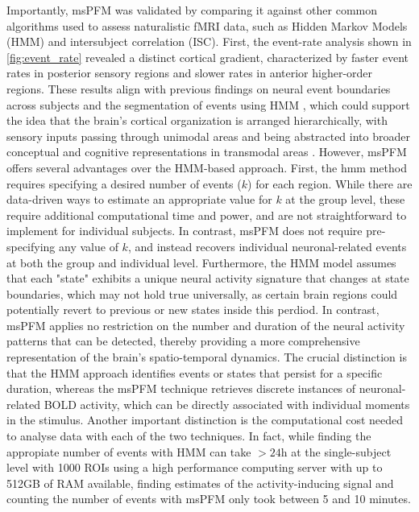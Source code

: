 Importantly, msPFM was validated by comparing it against other common algorithms
used to assess naturalistic fMRI data, such as Hidden Markov Models (HMM) and
intersubject correlation (ISC). First, the event-rate analysis shown in
\cref{fig:event_rate} revealed a distinct cortical gradient, characterized by
faster event rates in posterior sensory regions and slower rates in anterior
higher-order regions. These results align with previous findings on neural event
boundaries across subjects and the segmentation of events using HMM
\citep{Baldassano2017DiscoveringEventStructure,SavaSegal2022Individualvariabilityneural},
which could support the idea that the brain's cortical organization is arranged
hierarchically, with sensory inputs passing through unimodal areas and being
abstracted into broader conceptual and cognitive representations in transmodal
areas
\citep{Bernhardt2022Gradientsbrainorganization,Margulies2016Situatingdefaultmode,Samara2023Corticalgradientsnaturalistic}.
However, msPFM offers several advantages over the HMM-based approach. First, the
\acrshort*{hmm} method requires specifying a desired number of events ($k$) for
each region. While there are data-driven ways to estimate an appropriate value
for $k$ at the group level, these require additional computational time and
power, and are not straightforward to implement for individual subjects. In
contrast, msPFM does not require pre-specifying any value of $k$, and instead
recovers individual neuronal-related events at both the group and individual
level. Furthermore, the HMM model assumes that each "state" exhibits a unique
neural activity signature that changes at state boundaries, which may not hold
true universally, as certain brain regions could potentially revert to previous
or new states inside this perdiod. In contrast, msPFM applies no restriction on
the number and duration of the neural activity patterns that can be detected,
thereby providing a more comprehensive representation of the brain's
spatio-temporal dynamics. The crucial distinction is that the HMM approach
identifies events or states that persist for a specific duration, whereas the
msPFM technique retrieves discrete instances of neuronal-related BOLD activity,
which can be directly associated with individual moments in the stimulus.
Another important distinction is the computational cost needed to analyse data
with each of the two techniques. In fact, while finding the appropiate number of
events with HMM can take $>24$h at the single-subject level with 1000 ROIs using
a high performance computing server with up to 512GB of RAM available, finding
estimates of the activity-inducing signal and counting the number of events with
msPFM only took between 5 and 10 minutes.

